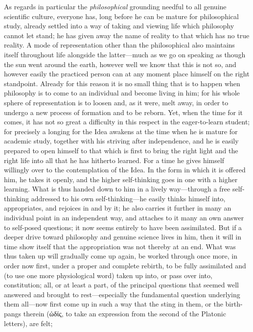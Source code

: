 \documentclass[12pt,a4paper]{book}
\begin{document}
As regards in particular the \emph{philosophical} grounding needful to all genuine scientific
culture, everyone has, long before he can be mature for philosophical study, already settled into a
way of taking and viewing life which philosophy cannot let stand; he has given away the name of
reality to that which has no true reality. A mode of representation other than the philosophical also
maintains itself throughout life alongside the latter---much as we go on speaking as though the sun
went around the earth, however well we know that this is not so, and however easily the practiced
person can at any moment place himself on the right standpoint. Already for this reason it is no small
thing that is to happen when philosophy is to come to an individual and become living in him; for his
whole sphere of representation is to loosen and, as it were, melt away, in order to undergo a new
process of formation and to be reborn. Yet, when the time for it comes, it has not so great a
difficulty in this respect in the eager-to-learn student; for precisely a longing for the Idea
awakens at the time when he is mature for academic study, together with his striving after
independence, and he is easily prepared to open himself to that which is first to bring the right
light and the right life into all that he has hitherto learned. For a time he gives himself willingly
over to the contemplation of the Idea. In the form in which it is offered him, he takes it openly, and
the higher self-thinking goes in one with a higher learning. What is thus handed down to him in a
lively way---through a free self-thinking addressed to his own self-thinking---he easily thinks
himself into, appropriates, and rejoices in and by it; he also carries it further in many an
individual point in an independent way, and attaches to it many an own answer to self-posed
questions; it now seems entirely to have been assimilated. But if a deeper drive toward philosophy
and genuine science lives in him, then it will in time show itself that the appropriation was not
thereby at an end. What was thus taken up will gradually come up again, be worked through once more,
in order now first, under a proper and complete rebirth, to be fully assimilated and (to use one more
physiological word) taken up into, or pass over into, constitution; all, or at least a part, of the
principal questions that seemed well answered and brought to rest---especially the fundamental
question underlying them all---now first come up in such a way that the sting in them, or the
birth-pangs therein (ὠδίς, to take an expression from the second of the Platonic letters), are felt;
\end{document}
